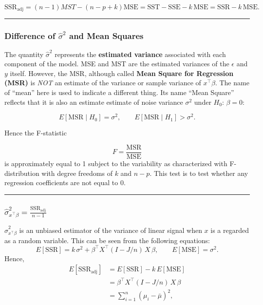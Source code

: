 \documentclass[
  letterpaper,
]{scrbook}
\begin{document}
\[
\mathrm{SSR}_{\mathrm{adj}} = (n-1)MST-(n-p+k)\mathrm{MSE} = \mathrm{SST}-\mathrm{SSE} - k\,\mathrm{MSE} = \mathrm{SSR} - k\,\mathrm{MSE}.
\]

\begin{center}\rule{0.5\linewidth}{0.5pt}\end{center}

\subsubsection{\texorpdfstring{Difference of \(\hat{\sigma}^2\) and Mean
Squares}{Difference of \textbackslash hat\{\textbackslash sigma\}\^{}2 and Mean Squares}}\label{difference-of-hatsigma2-and-mean-squares}

The quantity \(\hat{\sigma}^2\) represents the \textbf{estimated
variance} associated with each component of the model. MSE and MST are
the estimated variances of the \(\epsilon\) and \(y\) itself. However,
the MSR, although called \textbf{Mean Square for Regression (MSR)} is
\emph{NOT} an estimate of the variance or sample variance of
\(x^\top \beta\). The name of ``mean'' here is used to indicate a
different thing. Its name ``Mean Square'' reflects that it is also an
estimate estimate of noise variance \(\sigma^2\) under
\(H_0\!:\,\beta = 0\):

\[
E[\mathrm{MSR} \mid H_0] = \sigma^2,
\qquad 
E[\mathrm{MSR} \mid H_1] > \sigma^2.
\]

Hence the F-statistic

\[
F = \frac{\mathrm{MSR}}{\mathrm{MSE}}
\] is approximately equal to 1 subject to the variability as
characterized with F-distribution with degree freedoms of \(k\) and
\(n-p\). This test is to test whether any regression coefficients are
not equal to 0.

\begin{center}\rule{0.5\linewidth}{0.5pt}\end{center}

\subsubsection{\texorpdfstring{\(\hat \sigma^2_{x^\top\beta}=\frac{\mathrm{SSR}_{\text{adj}}}{n-1}\)}{\textbackslash hat \textbackslash sigma\^{}2\_\{x\^{}\textbackslash top\textbackslash beta\}=\textbackslash frac\{\textbackslash mathrm\{SSR\}\_\{\textbackslash text\{adj\}\}\}\{n-1\}}}\label{hat-sigma2_xtopbetafracmathrmssr_textadjn-1}

\(\hat \sigma^2_{x^\top\beta}\) is an unbiased estimator of the variance
of linear signal when \(x\) is a regarded as a random variable. This can
be seen from the following equations: \[
E[\mathrm{SSR}] = k\,\sigma^2 + \beta^\top X^\top (I - J/n)\,X\,\beta,
\qquad
E[\mathrm{MSE}] = \sigma^2.
\] Hence, \[
\begin{aligned}
E[\mathrm{SSR}_{\mathrm{adj}}]
&= E[\mathrm{SSR}] - k\,E[\mathrm{MSE}] \\
&= \beta^\top X^\top (I - J/n)\,X\,\beta \\
&= \sum_{i=1}^n (\mu_i - \bar\mu)^2,
\end{aligned}
\]
\end{document}
